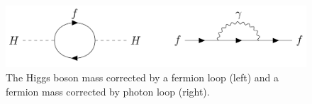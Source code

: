 \begin{figure}
\centering
\includegraphics[width=\textwidth]{figures/intro/loop_diagrams.png}
\caption{The Higgs boson mass corrected by a fermion loop (left) and a fermion mass corrected by photon loop (right).}
\label{loop_diagrams}
\end{figure}